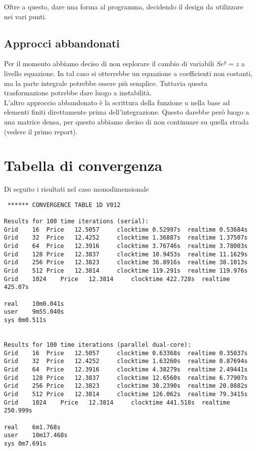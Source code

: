 \documentclass[a4paper,10pt]{article}
\begin{document}
Oltre a questo, dare una forma al programma, decidendo il design da utilizzare nei vari punti. 

\subsection{Approcci abbandonati}
Per il momento abbiamo deciso di non esplorare il cambio di variabili $Se^y=z$ a livello equazione. In tal caso si otterrebbe un equazione a coefficienti non costanti, ma la parte integrale potrebbe essere più semplice. Tuttavia questa trasformazione potrebbe dare luogo a instabilit\`a.\\
L'altro approccio abbandonato \`e la scrittura della funzione $u$ nella base ad elementi finiti direttamente prima dell'integrazione. Questo darebbe però luogo a una matrice densa, per questo abbiamo deciso di non continuare su quella strada (vedere il primo report).


\clearpage
\appendix
\section{Tabella di convergenza}
\label{app:conver}
Di seguito i risultati nel caso monodimensionale
\begin{verbatim}
 ****** CONVERGENCE TABLE 1D V012

Results for 100 time iterations (serial):
Grid	16	Price	12.5057		clocktime 0.52997s	realtime 0.53684s
Grid	32	Price	12.4252		clocktime 1.36887s	realtime 1.37507s
Grid	64	Price	12.3916		clocktime 3.76746s	realtime 3.78003s
Grid	128	Price	12.3837		clocktime 10.9453s	realtime 11.1629s
Grid	256	Price	12.3823		clocktime 36.8916s	realtime 38.1013s
Grid	512	Price	12.3814		clocktime 119.291s	realtime 119.976s
Grid	1024	Price	12.3814		clocktime 422.728s	realtime 425.07s

real	10m0.041s
user	9m55.040s
sys	0m0.511s


Results for 100 time iterations (parallel dual-core):
Grid	16	Price	12.5057		clocktime 0.63368s	realtime 0.35037s
Grid	32	Price	12.4252		clocktime 1.63260s	realtime 0.87694s
Grid	64	Price	12.3916		clocktime 4.38279s	realtime 2.49441s
Grid	128	Price	12.3837		clocktime 12.6560s	realtime 6.77907s
Grid	256	Price	12.3823		clocktime 38.2390s	realtime 20.8882s
Grid	512	Price	12.3814		clocktime 126.062s	realtime 79.3415s
Grid	1024	Price	12.3814		clocktime 441.518s	realtime 250.999s

real	6m1.768s
user	10m17.468s
sys	0m7.691s

\end{verbatim}
\end{document}
